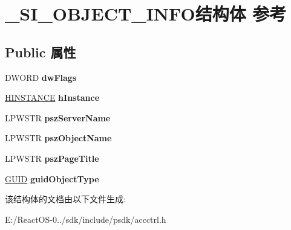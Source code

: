 \hypertarget{struct___s_i___o_b_j_e_c_t___i_n_f_o}{}\section{\+\_\+\+S\+I\+\_\+\+O\+B\+J\+E\+C\+T\+\_\+\+I\+N\+F\+O结构体 参考}
\label{struct___s_i___o_b_j_e_c_t___i_n_f_o}
\subsection*{Public 属性}
\begin{DoxyCompactItemize}
\item 
\mbox{\label{struct___s_i___o_b_j_e_c_t___i_n_f_o_a99951b86a91c3ff883783ee0b587da97}} 
D\+W\+O\+RD {\bfseries dw\+Flags}
\item 
\mbox{\label{struct___s_i___o_b_j_e_c_t___i_n_f_o_ac22c3eddfa9b70f48f4b63caab3da3da}} 
\hyperlink{interfacevoid}{H\+I\+N\+S\+T\+A\+N\+CE} {\bfseries h\+Instance}
\item 
\mbox{\label{struct___s_i___o_b_j_e_c_t___i_n_f_o_ac568f26f74e5f9fc6341a81680826ee8}} 
L\+P\+W\+S\+TR {\bfseries psz\+Server\+Name}
\item 
\mbox{\label{struct___s_i___o_b_j_e_c_t___i_n_f_o_a25c9ead231c38ec7041f2f3157e90978}} 
L\+P\+W\+S\+TR {\bfseries psz\+Object\+Name}
\item 
\mbox{\label{struct___s_i___o_b_j_e_c_t___i_n_f_o_a8e451cca19c783ab9c0b84b5e76136bd}} 
L\+P\+W\+S\+TR {\bfseries psz\+Page\+Title}
\item 
\mbox{\label{struct___s_i___o_b_j_e_c_t___i_n_f_o_a468b5b73869d43232fc95a5a2849b1ec}} 
\hyperlink{interface_g_u_i_d}{G\+U\+ID} {\bfseries guid\+Object\+Type}
\end{DoxyCompactItemize}


该结构体的文档由以下文件生成\+:\begin{DoxyCompactItemize}
\item 
E\+:/\+React\+O\+S-\/0../sdk/include/psdk/accctrl.\+h\end{DoxyCompactItemize}
